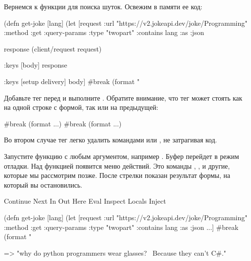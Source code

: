 Вернемся к функции  для поиска шуток. Освежим в памяти ее код:

\begin{english}
  \begin{clojure}
(defn get-joke [lang]
  (let [request
        {:url "https://v2.jokeapi.dev/joke/Programming"
         :method :get
         :query-params {:type "twopart" :contains lang}
         :as :json}

        response
        (client/request request)

        {:keys [body]}
        response

        {:keys [setup delivery]}
        body]
    #break
    (format "%
  \end{clojure}
\end{english}

Добавьте тег  перед  и выполните . Обратите внимание, что тег может стоять как на одной строке с формой, так или на предыдущей:

\begin{english}
\begin{clojure}
#break (format ...)     #break
                        (format ...)
  \end{clojure}
\end{english}

Во втором случае тег легко удалить командами  или , не затрагивая код.

Запустите функцию с любым аргументом, например . Буфер перейдет в режим отладки. Над функцией появится меню действий. Это команды , ,  и другие, которые мы рассмотрим позже. После стрелки \code{=>} показан результат формы, на который вы остановились.

\begin{english}
  \begin{clojure}
Continue Next In Out Here Eval Inspect Locals Inject

(defn get-joke [lang]
  (let [request
        {:url "https://v2.jokeapi.dev/joke/Programming"
         :method :get
         :query-params {:type "twopart" :contains lang}
         :as :json}
        ...]
    #break
    (format "%

 => "why do python programmers wear glasses? \
     Because they can't C#."
  \end{clojure}
\end{english}

